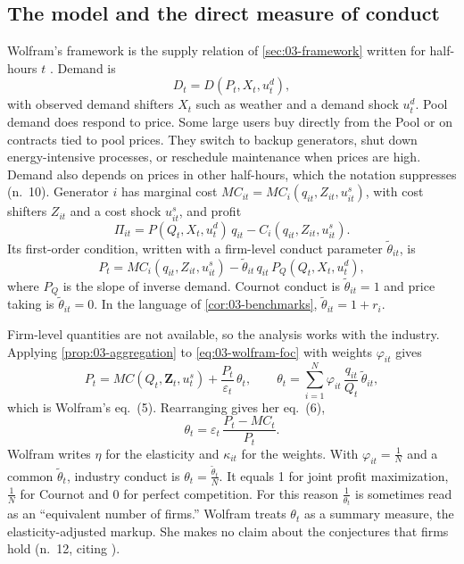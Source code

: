 \subsection{The model and the direct measure of conduct}\label{sec:03-wolfram-model}

Wolfram's framework is the supply relation of \cref{sec:03-framework} written for half-hours $t$
\citep[pp.~808--809]{Wolfram1999}. Demand is
\begin{equation*}
D_t = D(P_t, X_t, u^d_t),
\end{equation*}
with observed demand shifters $X_t$ such as weather and a demand shock $u^d_t$. Pool demand does respond to price. Some
large users buy directly from the Pool or on contracts tied to pool prices. They switch to backup generators, shut down
energy-intensive processes, or reschedule maintenance when prices are high. Demand also depends on prices in other
half-hours, which the notation suppresses (n.~10). Generator $i$ has marginal cost $MC_{it} = MC_i(q_{it}, Z_{it},
u^s_{it})$, with cost shifters $Z_{it}$ and a cost shock $u^s_{it}$, and profit
\begin{equation*}
\Pi_{it} = P(Q_t, X_t, u^d_t)\, q_{it} - C_i(q_{it}, Z_{it}, u^s_{it}).
\end{equation*}
Its first-order condition, written with a firm-level conduct parameter $\tilde\theta_{it}$, is
\begin{equation}\label{eq:03-wolfram-foc}
P_t = MC_i(q_{it}, Z_{it}, u^s_{it}) - \tilde\theta_{it}\, q_{it}\, P_Q(Q_t, X_t, u^d_t),
\end{equation}
where $P_Q$ is the slope of inverse demand. Cournot conduct is $\tilde\theta_{it} = 1$ and price taking is
$\tilde\theta_{it} = 0$. In the language of \cref{cor:03-benchmarks}, $\tilde\theta_{it} = 1 + r_i$.

Firm-level quantities are not available, so the analysis works with the industry. Applying
\cref{prop:03-aggregation} to \eqref{eq:03-wolfram-foc} with weights $\varphi_{it}$ gives
\begin{equation}\label{eq:03-wolfram-supply}
P_t = MC(Q_t, \mathbf{Z}_t, u^s_t) + \frac{P_t}{\varepsilon_t}\,\theta_t,
\qquad
\theta_t = \sum_{i=1}^{N} \varphi_{it}\,\frac{q_{it}}{Q_t}\,\tilde\theta_{it},
\end{equation}
which is Wolfram's eq.~(5). Rearranging gives her eq.~(6),
\begin{equation}\label{eq:03-wolfram-theta}
\theta_t = \varepsilon_t\,\frac{P_t - MC_t}{P_t}.
\end{equation}
Wolfram writes $\eta$ for the elasticity and $\kappa_{it}$ for the weights. With $\varphi_{it} = \frac{1}{N}$ and a common
$\tilde\theta_t$, industry conduct is $\theta_t = \frac{\tilde\theta_t}{N}$. It equals 1 for joint profit maximization,
$\frac{1}{N}$ for Cournot and 0 for perfect competition. For this reason $\frac{1}{\theta_t}$ is sometimes read as an
``equivalent number of firms.'' Wolfram treats $\theta_t$ as a summary measure, the elasticity-adjusted markup. She makes
no claim about the conjectures that firms hold (n.~12, citing \citealp{Corts1999}).

